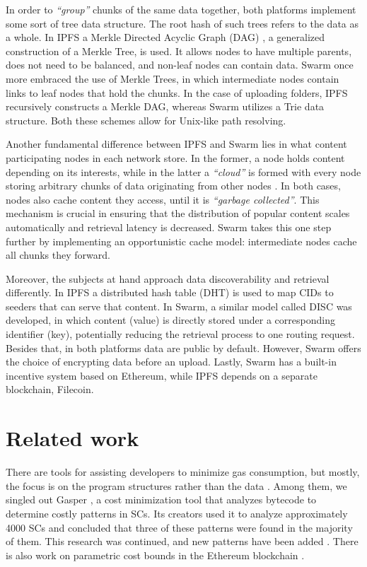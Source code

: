 In order to \emph{``group''} chunks of the same data together, both platforms implement some sort of tree data structure. The root hash of such trees refers to the data as a whole. In IPFS a Merkle Directed Acyclic Graph (DAG)  \citep{benet_2014}, a generalized construction of a Merkle Tree, is used. It allows nodes to have multiple parents, does not need to be balanced, and non-leaf nodes can contain data. Swarm once more embraced the use of Merkle Trees, in which intermediate nodes contain links to leaf nodes that hold the chunks. In the case of uploading folders, IPFS recursively constructs a Merkle DAG, whereas Swarm utilizes a Trie  \citep{tron_2020} data structure. Both these schemes allow for Unix-like path resolving.

Another fundamental difference between IPFS and Swarm lies in what content participating nodes in each network store. In the former, a node holds content depending on its interests, while in the latter a \emph{``cloud''} is formed with every node storing arbitrary chunks of data originating from other nodes \citep{swarmwiki_2019}. In both cases, nodes also cache content they access, until it is \emph{``garbage collected''}. This mechanism is crucial in ensuring that the distribution of popular content scales automatically and retrieval latency is decreased. Swarm takes this one step further by implementing an opportunistic cache model: intermediate nodes cache all chunks they forward.

Moreover, the subjects at hand approach data discoverability and retrieval differently. In IPFS a distributed hash table (DHT) \citep{benet_2014} is used to map CIDs to seeders that can serve that content. In Swarm, a similar model called DISC  \citep{tron_2020} was developed, in which content (value) is directly stored under a corresponding identifier (key), potentially reducing the retrieval process to one routing request. Besides that, in both platforms data are public by default. However, Swarm offers the choice of encrypting data before an upload. Lastly, Swarm has a built-in incentive system based on Ethereum, while IPFS depends on a separate blockchain, Filecoin. 

\section{Related work}\label{sec:related_work}
There are tools for assisting developers to minimize gas consumption, but mostly, the focus is on the program structures rather than the data  \citep{nelaturu_2021, chen_2017, chen_2021}. Among them, we singled out Gasper  \citep{chen_2017}, a cost minimization tool that analyzes bytecode to determine costly patterns in SCs. Its creators used it to analyze approximately 4000 SCs and concluded that three of these patterns were found in the majority of them. This research was continued, and new patterns have been added  \citep{chen_2021}. There is also work on parametric cost bounds in the Ethereum blockchain \citep{albert_2021}.

